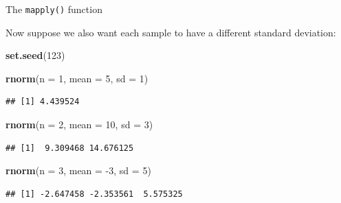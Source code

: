 \documentclass[ignorenonframetext,]{beamer}
\newenvironment{Shaded}{\begin{snugshade}}{\end{snugshade}}
\newcommand{\DataTypeTok}[1]{\textcolor[rgb]{0.13,0.29,0.53}{#1}}
\newcommand{\DecValTok}[1]{\textcolor[rgb]{0.00,0.00,0.81}{#1}}
\newcommand{\KeywordTok}[1]{\textcolor[rgb]{0.13,0.29,0.53}{\textbf{#1}}}
\newcommand{\NormalTok}[1]{#1}
\begin{document}
\begin{frame}[fragile]{The \texttt{mapply()} function}
\protect\hypertarget{the-mapply-function-6}{}

Now suppose we also want each sample to have a different standard
deviation:

\begin{Shaded}
\begin{Highlighting}[]
\KeywordTok{set.seed}\NormalTok{(}\DecValTok{123}\NormalTok{)}

\KeywordTok{rnorm}\NormalTok{(}\DataTypeTok{n =} \DecValTok{1}\NormalTok{, }\DataTypeTok{mean =} \DecValTok{5}\NormalTok{, }\DataTypeTok{sd =} \DecValTok{1}\NormalTok{)}
\end{Highlighting}
\end{Shaded}

\begin{verbatim}
## [1] 4.439524
\end{verbatim}

\begin{Shaded}
\begin{Highlighting}[]
\KeywordTok{rnorm}\NormalTok{(}\DataTypeTok{n =} \DecValTok{2}\NormalTok{, }\DataTypeTok{mean =} \DecValTok{10}\NormalTok{, }\DataTypeTok{sd =} \DecValTok{3}\NormalTok{)}
\end{Highlighting}
\end{Shaded}

\begin{verbatim}
## [1]  9.309468 14.676125
\end{verbatim}

\begin{Shaded}
\begin{Highlighting}[]
\KeywordTok{rnorm}\NormalTok{(}\DataTypeTok{n =} \DecValTok{3}\NormalTok{, }\DataTypeTok{mean =} \DecValTok{-3}\NormalTok{, }\DataTypeTok{sd =} \DecValTok{5}\NormalTok{)}
\end{Highlighting}
\end{Shaded}

\begin{verbatim}
## [1] -2.647458 -2.353561  5.575325
\end{verbatim}

\end{frame}
\end{document}
